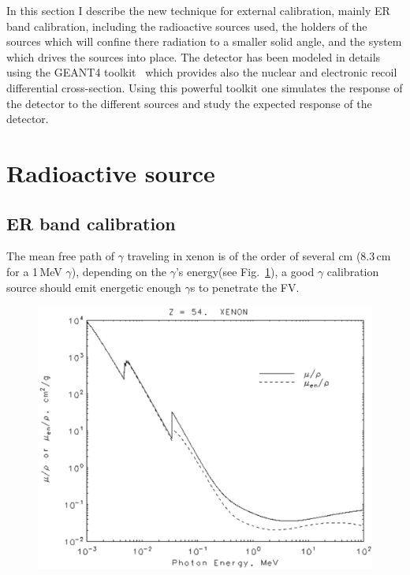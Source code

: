In this section I describe the new technique for external calibration, mainly ER band calibration, including the radioactive sources used, the holders of the sources which will confine there radiation to a smaller solid angle, and the system which drives the sources into place. The detector has been modeled in details using the GEANT4 toolkit~\cite{AGOSTINELLI2003250} which provides also the nuclear and electronic recoil differential cross-section. Using this powerful toolkit one simulates the response of the detector to the different sources and study the expected response of the detector. 



\section{Radioactive source}
\label{sec:source}
\subsection{ER band calibration}
The mean free path of $\gamma$ traveling in xenon is of the order of several cm (8.3\,cm for a 1\,MeV $\gamma$), depending on the $\gamma$'s energy(see Fig.~\ref{fig:MFP}), a good $\gamma$ calibration source should emit energetic enough $\gamma$s to penetrate the FV. 

\begin{figure}
	\begin{center}
	\includegraphics[width=\textwidth]{figs/NISTAttXenon.png}%
		\label{fig:MFP}
		\end{center}
	
\end{figure} 

